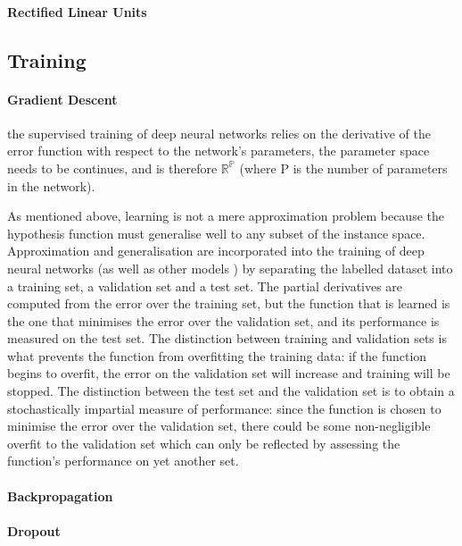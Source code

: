 \documentclass[a4paper,11pt]{article}
\begin{document}
\paragraph{Rectified Linear Units}



\subsection{Training}
\paragraph{Gradient Descent}

the supervised training of deep neural networks relies on the derivative of the error function with respect to the network's parameters, the parameter space needs to be continues, and is therefore $\mathbb{R^{P}}$ (where P is the number of parameters in the network).

As mentioned above, learning is not a mere approximation problem because the hypothesis function must generalise well to any subset of the instance space. Approximation and generalisation are incorporated into the training of deep neural networks (as well as other models \cite{train&test}) by separating the labelled dataset into a training set, a validation set and a test set. The partial derivatives are computed from the error over the training set, but the function that is learned is the one that minimises the error over the validation set, and its performance is measured on the test set. The distinction between training and validation sets is what prevents the function from overfitting the training data: if the function begins to overfit, the error on the validation set will increase and training will be stopped. The distinction between the test set and the validation set is to obtain a stochastically impartial measure of performance: since the function is chosen to minimise the error over the validation set, there could be some non-negligible overfit to the validation set which can only be reflected by assessing the function's performance on yet another set.

\paragraph{Backpropagation}
\paragraph{Dropout}
\end{document}
